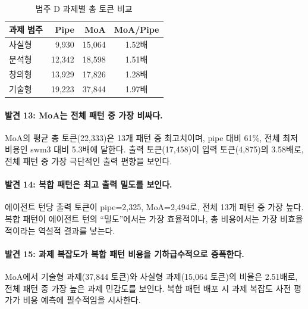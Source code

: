 \begin{table}[H]
\centering
\caption{범주 D 과제별 총 토큰 비교}
\label{tab:cat-d-task}
{\small
\begin{tabular}{lrrc}
\toprule
과제 범주 & Pipe & MoA & MoA/Pipe \\
\midrule
사실형 & 9,930  & 15,064 & 1.52배 \\
분석형 & 12,342 & 18,598 & 1.51배 \\
창의형 & 13,929 & 17,826 & 1.28배 \\
기술형 & 19,223 & 37,844 & 1.97배 \\
\bottomrule
\end{tabular}
}
\end{table}

\paragraph{발견 13: MoA는 전체 패턴 중 가장 비싸다.}
MoA의 평균 총 토큰(22,333)은 13개 패턴 중 최고치이며, pipe 대비 61\%, 전체 최저 비용인 swm3 대비 5.3배에 달한다. 출력 토큰(17,458)이 입력 토큰(4,875)의 3.58배로, 전체 패턴 중 가장 극단적인 출력 편향을 보인다.

\paragraph{발견 14: 복합 패턴은 최고 출력 밀도를 보인다.}
에이전트 턴당 출력 토큰이 pipe=2,325, MoA=2,494로, 전체 13개 패턴 중 가장 높다. 복합 패턴이 에이전트 턴의 ``밀도''에서는 가장 효율적이나, 총 비용에서는 가장 비효율적이라는 역설적 결과를 낳는다.

\paragraph{발견 15: 과제 복잡도가 복합 패턴 비용을 기하급수적으로 증폭한다.}
MoA에서 기술형 과제(37,844 토큰)와 사실형 과제(15,064 토큰)의 비율은 2.51배로, 전체 패턴 중 가장 높은 과제 민감도를 보인다. 복합 패턴 배포 시 과제 복잡도 사전 평가가 비용 예측에 필수적임을 시사한다.

